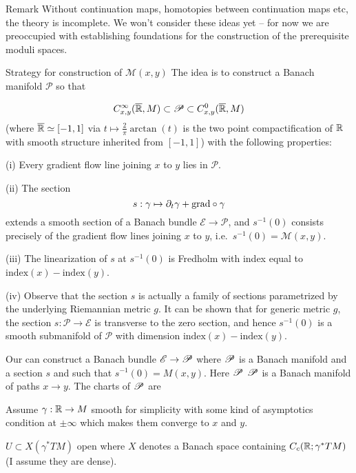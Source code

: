 \documentclass{amsart}
\begin{document}
\begin{clear}{Remark}
Without continuation maps, homotopies between continuation maps etc,
the theory is incomplete. We won't consider these ideas yet -- for now
we are preoccupied with establishing foundations for the construction
of the prerequisite moduli spaces.
\end{clear}

\begin{clear}{Strategy for construction of $\mathscr{M}(x,y)$}  
The idea is to construct a Banach manifold $\mathscr{P}$ so that

$$C^{\infty}_{x,y}(\closure{\R},M)\subset\mathscr{P}\subset
C^{0}_{x,y}(\closure{\R},M)$$ (where $\closure{\R}\simeq [-1,1]$ via
$t\mapsto \frac{2}{\pi}\arctan(t)$ is the two point
compactification of $\R$ with smooth structure inherited from
$[-1,1]$) with the following properties:

(i) Every gradient flow line joining $x$ to $y$ lies in $\mathscr{P}$.

(ii) The section
\begin{equation*}
  s:\gamma \mapsto \bd_{t}\gamma+\grad\circ \gamma
\end{equation*}
extends a smooth section of a Banach bundle $\mathscr{E}\to
\mathscr{P}$, and $s^{-1}(0)$ consists precisely of the gradient flow
lines joining $x$ to $y$, i.e.\ $s^{-1}(0)=\mathscr{M}(x,y)$.

(iii) The linearization of $s$ at $s^{-1}(0)$ is Fredholm with index
equal to $\text{index}(x)-\text{index}(y)$.

(iv) Observe that the section $s$ is actually a family of sections
parametrized by the underlying Riemannian metric $g$. It can be shown that
for generic metric $g$, the section $s:\mathscr{P}\to \mathscr{E}$ is
transverse to the zero section, and hence $s^{-1}(0)$ is a smooth
submanifold of $\mathscr{P}$ with dimension $\text{index}(x)-\text{index}(y)$.
\end{clear}



Our can construct a Banach bundle $\E\to\P$ where $\P$ is a Banach
manifold and a section $s$ and such that $s^{-1}(0)=M(x,y)$. Here $\P$ 
$\P$ is a Banach manifold of paths $x\to y$. The charts of $\P$ are 

Assume $\gamma:\R\to M$ smooth for simplicity with some kind of
asymptotics condition at $\pm\infty$ which makes them converge to $x$
and $y$.

$U\subset X(\gamma^*TM)$ open where $X$ denotes a Banach space
containing $C_c(\R;\gamma^*TM)$ (I assume they are dense).
\end{document}
